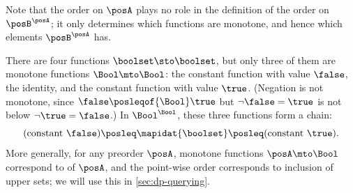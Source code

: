 Note that the order on $\posA$ plays no role in the definition of the order on $\posB^{\posA}$; it only determines which functions are monotone, and hence which elements $\posB^{\posA}$ has.

\begin{example}
    \label{exa:bool-bool}
    There are four functions $\boolset \sto \boolset$, but only three of them are monotone functions $\Bool \mto \Bool$: the constant function with value $\false$, the identity, and the constant function with value $\true$.
    (Negation is not monotone, since $\false \posleqof{\Bool} \true$ but $\lnot \false = \true$ is not below $\lnot \true = \false$.)
    In $\Bool^{\Bool}$, these three functions form a chain:
    \begin{equation}
        (\text{constant } \false) \posleq \mapidat{\boolset} \posleq (\text{constant } \true).
    \end{equation}
    More generally, for any preorder $\posA$, monotone functions $\posA \mto \Bool$ correspond to  of $\posA$, and the point-wise order corresponds to inclusion of upper sets; we will use this in \cref{sec:dp-querying}.
\end{example}

